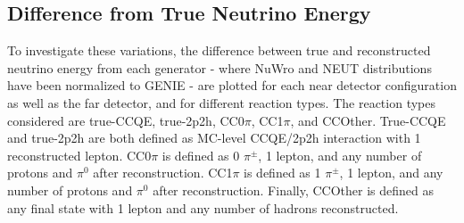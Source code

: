 \documentclass[12pt]{article}
\begin{document}
\subsection{Difference from True Neutrino Energy}
\label{subsec:EDiff}
To investigate these variations, the difference between true and reconstructed neutrino energy from each generator - where NuWro and NEUT distributions have been normalized to GENIE - are plotted for each near detector configuration as well as the far detector, and for different reaction types. The reaction types considered are true-CCQE, true-2p2h, CC0$\pi$, CC1$\pi$, and CCOther. True-CCQE and true-2p2h are both defined as MC-level CCQE/2p2h interaction with 1 reconstructed lepton. CC0$\pi$ is defined as 0 $\pi^{\pm}$, 1 lepton, and any number of protons and $\pi^0$ after reconstruction. CC1$\pi$ is defined as 1 $\pi^{\pm}$, 1 lepton, and any number of protons and $\pi^0$ after reconstruction. Finally, CCOther is defined as any final state with 1 lepton and any number of hadrons reconstructed.
\end{document}
